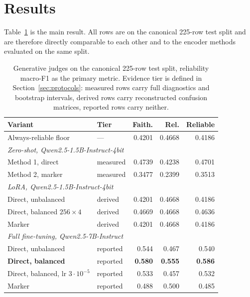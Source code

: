\documentclass{zapiski}
\begin{document}
\section{Results}
\label{sec:results}

Table~\ref{tab:main-results} is the main result. All rows are on the canonical
225-row test split and are therefore directly comparable to each other and to
the encoder methods evaluated on the same split.

\begin{table}[H]
\centering
\caption{Generative judges on the canonical 225-row test split, reliability
macro-F1 as the primary metric. Evidence tier is defined in
Section~\ref{sec:protocols}: measured rows carry full diagnostics and
bootstrap intervals, derived rows carry reconstructed confusion matrices,
reported rows carry neither.}
\label{tab:main-results}
\footnotesize
\begin{tabularx}{\linewidth}{Xlrrr}
\toprule
Variant & Tier & Faith. & Rel. & Reliable \\
\midrule
Always-reliable floor                    & ---      & 0.4201 & 0.4668 & 0.4186 \\
\midrule
\multicolumn{5}{l}{\emph{Zero-shot, Qwen2.5-1.5B-Instruct-4bit}} \\
Method 1, direct                         & measured & 0.4739 & 0.4238 & 0.4701 \\
Method 2, marker                         & measured & 0.3477 & 0.2399 & 0.3513 \\
\midrule
\multicolumn{5}{l}{\emph{LoRA, Qwen2.5-1.5B-Instruct-4bit}} \\
Direct, unbalanced                       & derived  & 0.4201 & 0.4668 & 0.4186 \\
Direct, balanced $256{\times}4$          & derived  & 0.4669 & 0.4668 & 0.4636 \\
Marker                                   & derived  & 0.4201 & 0.4668 & 0.4186 \\
\midrule
\multicolumn{5}{l}{\emph{Full fine-tuning, Qwen2.5-7B-Instruct}} \\
Direct, unbalanced                       & reported & 0.544  & 0.467  & 0.540  \\
\textbf{Direct, balanced}                & reported & \textbf{0.580} & \textbf{0.555} & \textbf{0.586} \\
Direct, balanced, lr $3\cdot10^{-5}$     & reported & 0.533  & 0.457  & 0.532  \\
Marker                                   & reported & 0.488  & 0.500  & 0.485  \\
\bottomrule
\end{tabularx}
\end{table}
\end{document}
